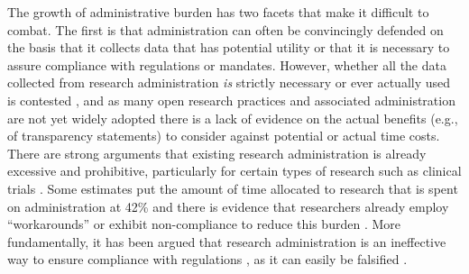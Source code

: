 \documentclass[ authordate, meta, issue]{jote-new-article}
\begin{document}
The growth of administrative burden has two facets that make it difficult to combat. The first is that administration can often be convincingly defended on the basis that it collects data that has potential utility or that it is necessary to assure compliance with regulations or mandates. However, whether all the data collected from research administration \emph{is} strictly necessary or ever actually used is contested \parencites{OLeary2013}, and as many open research practices and associated administration are not yet widely adopted there is a lack of evidence on the actual benefits (e.g., of transparency statements) to consider against potential or actual time costs. There are strong arguments that existing research administration is already excessive and prohibitive, particularly for certain types of research such as clinical trials \parencites{Stewart2015}. Some estimates put the amount of time allocated to research that is spent on administration at 42\% \parencites{Rockwell2009} and there is evidence that researchers already employ “workarounds” or exhibit non-compliance to reduce this burden \parencites{Bozeman2021}. More fundamentally, it has been argued that research administration is an ineffective way to ensure compliance with regulations \parencites{Schneider2015}, as it can easily be falsified \parencites[e.g., claiming data is available when it is not;][]{Gabelica2022}.
\end{document}
